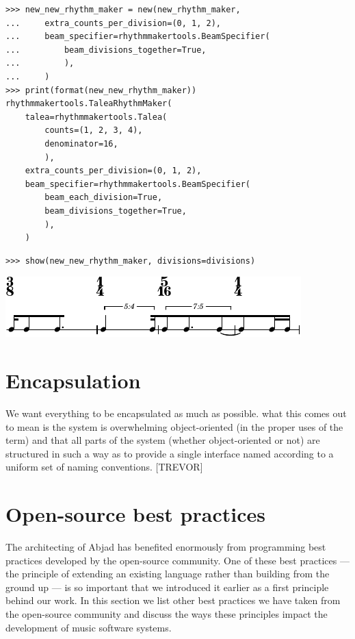 \documentclass{article}
\begin{document}
\begin{lstlisting}
>>> new_new_rhythm_maker = new(new_rhythm_maker,
...     extra_counts_per_division=(0, 1, 2),
...     beam_specifier=rhythmmakertools.BeamSpecifier(
...         beam_divisions_together=True,
...         ),
...     )
>>> print(format(new_new_rhythm_maker))
rhythmmakertools.TaleaRhythmMaker(
    talea=rhythmmakertools.Talea(
        counts=(1, 2, 3, 4),
        denominator=16,
        ),
    extra_counts_per_division=(0, 1, 2),
    beam_specifier=rhythmmakertools.BeamSpecifier(
        beam_each_division=True,
        beam_divisions_together=True,
        ),
    )
\end{lstlisting}

\begin{lstlisting}
>>> show(new_new_rhythm_maker, divisions=divisions)
\end{lstlisting}
\includegraphics{assets/lilypond-23e2752f7db7cf02e31cf8e9f399c5b6.pdf}

\section{Encapsulation} \label{sec:encapsulation}

We want everything to be encapsulated as much as possible. what this comes out
to mean is the system is overwhelming object-oriented (in the proper uses of
the term) and that all parts of the system (whether object-oriented or not) are
structured in such a way as to provide a single interface named according to a
uniform set of naming conventions. [TREVOR]

\section{Open-source best practices} \label{sec:open-source}

The architecting of Abjad has benefited enormously from programming best
practices developed by the open-source community. One of these best practices
--- the principle of extending an existing language rather than building from
the ground up --- is so important that we introduced it earlier as a first
principle behind our work. In this section we list other best practices we have
taken from the open-source community and discuss the ways these principles
impact the development of music software systems.
\end{document}
